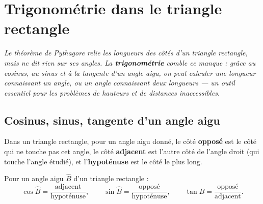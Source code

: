 \chapter{Trigonométrie dans le triangle rectangle}

\noindent\textit{Le théorème de Pythagore relie les longueurs des côtés d'un triangle
rectangle, mais ne dit rien sur ses angles. La \textbf{trigonométrie} comble ce manque :
grâce au cosinus, au sinus et à la tangente d'un angle aigu, on peut calculer une longueur
connaissant un angle, ou un angle connaissant deux longueurs — un outil essentiel pour les
problèmes de hauteurs et de distances inaccessibles.}
\vspace{8pt}

\connecteBanner

\section{Cosinus, sinus, tangente d'un angle aigu}

\begin{definition}
Dans un triangle rectangle, pour un angle aigu donné, le côté \textbf{opposé} est le côté
qui ne touche pas cet angle, le côté \textbf{adjacent} est l'autre côté de l'angle droit
(qui touche l'angle étudié), et l'\textbf{hypoténuse} est le côté le plus long.
\end{definition}

\begin{illus}
\end{illus}

\begin{propriete}
Pour un angle aigu $\widehat B$ d'un triangle rectangle :
\[
\cos\widehat B=\frac{\text{adjacent}}{\text{hypoténuse}}, \qquad
\sin\widehat B=\frac{\text{opposé}}{\text{hypoténuse}}, \qquad
\tan\widehat B=\frac{\text{opposé}}{\text{adjacent}}.
\]
\end{propriete}

